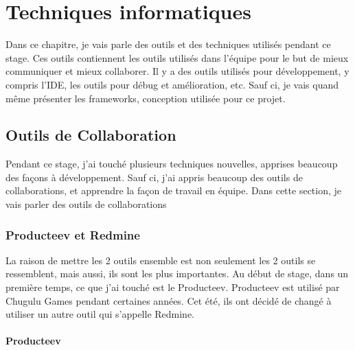 \chapter{Techniques informatiques} %
\label{cha:techniques_informatiques}

Dans ce chapitre, je vais parle des outils et des techniques utilisés pendant ce stage. Ces outils contiennent les outils utilisés dans l'équipe pour le but de mieux communiquer et mieux collaborer. Il y a des outils utilisés pour développement, y compris l'IDE, les outils pour débug et amélioration, etc. Sauf ci, je vais quand même présenter les frameworks, conception utilisée pour ce projet.

\section{Outils de Collaboration} %
\label{sec:outils_de_collaboration}

Pendant ce stage, j'ai touché plusieurs techniques nouvelles, apprises beaucoup des façons à développement. Sauf ci, j'ai appris beaucoup des outils de collaborations, et apprendre la façon de travail en équipe. Dans cette section, je vais parler des outils de collaborations

\subsection{Producteev et Redmine} %
\label{ssub:producteev_et_redmine}

La raison de mettre les 2 outils ensemble est non seulement les 2 outils se ressemblent, mais aussi, ils sont les plus importantes. Au début de stage, dans un première temps, ce que j'ai touché est le Producteev. Producteev est utilisé par Chugulu Games pendant certaines années. Cet été, ils ont décidé de changé à utiliser un autre outil qui s'appelle Redmine. 

\subsubsection{Producteev} %
\label{ssub:producteev}



